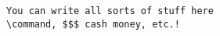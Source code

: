 \documentclass{article}
\begin{document}
\begin{verbatim}
You can write all sorts of stuff here
\command, $$$ cash money, etc.!

\end{verbatim}
\end{document}
